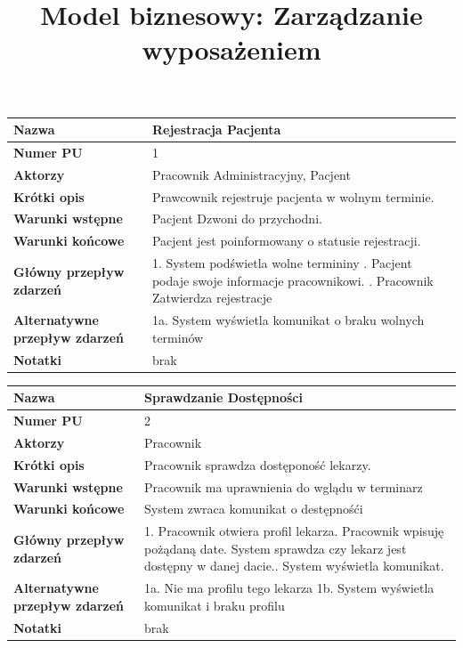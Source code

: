 \documentclass{article}
\title{Model biznesowy: Zarządzanie wyposażeniem}
\author{}
\date{}
\begin{document}
    \maketitle
	\begin{tabular}{|m{10em}|m{30em}|}
	\hline
	\textbf{Nazwa} & Rejestracja Pacjenta \\
	\hline
	\textbf{Numer PU} & 1 \\
	\hline
	\textbf{Aktorzy} & Pracownik Administracyjny, Pacjent \\
	\hline
	\textbf{Krótki opis} & Prawcownik rejestruje pacjenta w wolnym terminie. \\
	\hline
	\textbf{Warunki wstępne} & Pacjent Dzwoni do przychodni. \\
	\hline
	\textbf{Warunki końcowe} & Pacjent jest poinformowany o statusie rejestracji.\\
	\hline
	\textbf{Główny przepływ zdarzeń} & 
		1. System podświetla wolne termininy \newline
		2. Pacjent podaje swoje informacje pracownikowi. \newline
		3. Pracownik Zatwierdza rejestracje   \\
	\hline
	\textbf{Alternatywne przepływ zdarzeń} & 1a. System wyświetla komunikat o braku wolnych terminów\\
	\hline 
	\textbf{Notatki} & brak \\
	\hline
	\end{tabular}
	
    \vspace{1cm}
    
    \begin{tabular}{|m{10em}|m{30em}|}
    	\hline
    	\textbf{Nazwa} & Sprawdzanie Dostępności  \\
    	\hline
    	\textbf{Numer PU} & 2 \\
    	\hline
    	\textbf{Aktorzy} & Pracownik \\
    	\hline
    	\textbf{Krótki opis} & Pracownik sprawdza dostęponość lekarzy. \\
    	\hline
    	\textbf{Warunki wstępne} & Pracownik ma uprawnienia do wglądu w terminarz \\
    	\hline
    	\textbf{Warunki końcowe} &  System zwraca komunikat o  destępnośći\\
    	\hline
    	\textbf{Główny przepływ zdarzeń} & 
    	1. Pracownik otwiera profil lekarza\newline
    	2. Pracownik wpisuję pożądaną date.\newline
    	3  System sprawdza czy lekarz jest dostępny w danej dacie.\newline
    	4. System wyświetla komunikat.\\
    	\hline
    	\textbf{Alternatywne przepływ zdarzeń} & 1a. Nie ma profilu tego lekarza \newline
    											 1b. System wyświetla komunikat i braku profilu\\
    	\hline 
    	\textbf{Notatki} & brak \\
    	\hline
    \end{tabular}
    
\end{document}
